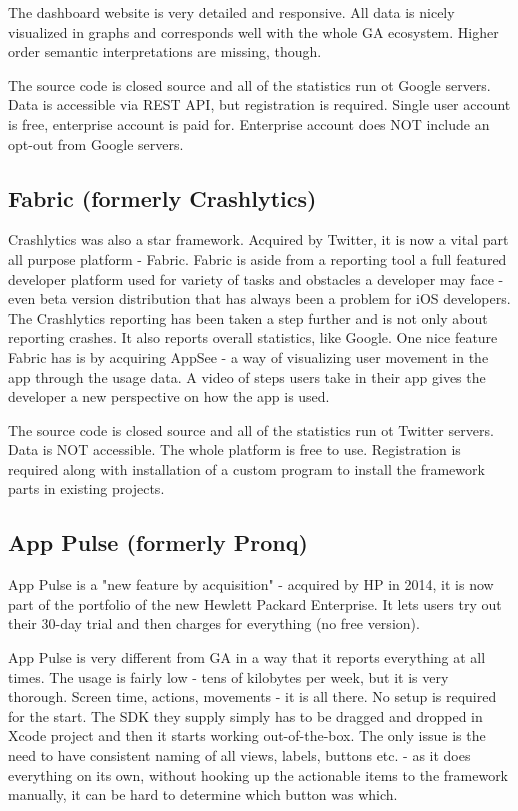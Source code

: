 The dashboard website is very detailed and responsive. All data is nicely visualized in graphs and corresponds well with the whole GA ecosystem. Higher order semantic interpretations are missing, though.

The source code is closed source and all of the statistics run ot Google servers. Data is accessible via REST API, but registration is required. Single user account is free, enterprise account is paid for. Enterprise account does NOT include an opt-out from Google servers.

\subsection{Fabric (formerly Crashlytics)}

Crashlytics was also a star framework. Acquired by Twitter, it is now a vital part all purpose platform - Fabric. Fabric is aside from a reporting tool a full featured developer platform used for variety of tasks and obstacles a developer may face - even beta version distribution that has always been a problem for iOS developers. The Crashlytics reporting has been taken a step further and is not only about reporting crashes. It also reports overall statistics, like Google. One nice feature Fabric has is by acquiring AppSee - a way of visualizing user movement in the app through the usage data. A video of steps users take in their app gives the developer a new perspective on how the app is used.

The source code is closed source and all of the statistics run ot Twitter servers. Data is NOT accessible. The whole platform is free to use. Registration is required along with installation of a custom program to install the framework parts in existing projects.

\subsection{App Pulse (formerly Pronq)}

App Pulse is a "new feature by acquisition" - acquired by HP in 2014, it is now part of the portfolio of the new Hewlett Packard Enterprise. It lets users try out their 30-day trial and then charges for everything (no free version).

App Pulse is very different from GA in a way that it reports everything at all times. The usage is fairly low - tens of kilobytes per week, but it is very thorough. Screen time, actions, movements - it is all there. No setup is required for the start. The SDK they supply simply has to be dragged and dropped in Xcode project and then it starts working out-of-the-box. The only issue is the need to have consistent naming of all views, labels, buttons etc. - as it does everything on its own, without hooking up the actionable items to the framework manually, it can be hard to determine which button was which.

